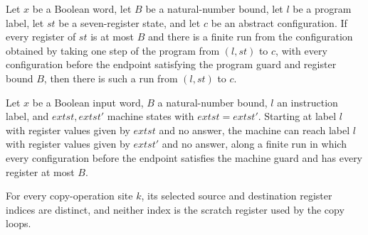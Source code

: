 \begin{lemma}
\label{Complexity.LogProg.TQBFARM.step_of}
\leanok
{}
Let $x$ be a Boolean word, let $B$ be a natural-number bound, let $l$ be a program
label, let $st$ be a seven-register state, and let $c$ be an abstract configuration. If
every register of $st$ is at most $B$ and there is a finite run from the configuration
obtained by taking one step of the program from $(l,st)$ to $c$, with every
configuration before the endpoint satisfying the program guard and register bound $B$,
then there is such a run from $(l,st)$ to $c$.
\end{lemma}

\begin{lemma}
\label{Complexity.LogProg.TQBFARM.fin_of}
\leanok
{}
Let $x$ be a Boolean input word, $B$ a natural-number bound, $l$ an instruction label,
and $	ext{st},	ext{st}'$ machine states with $	ext{st}=	ext{st}'$. Starting at label $l$
with register values given by $	ext{st}$ and no answer, the machine can reach label $l$
with register values given by $	ext{st}'$ and no answer, along a finite run in which
every configuration before the endpoint satisfies the machine guard and has every
register at most $B$.
\end{lemma}

\begin{lemma}
\label{Complexity.LogProg.TQBFARM.cp_ne}
\leanok
{}
For every copy-operation site $k$, its selected source and destination register indices
are distinct, and neither index is the scratch register used by the copy loops.
\end{lemma}


